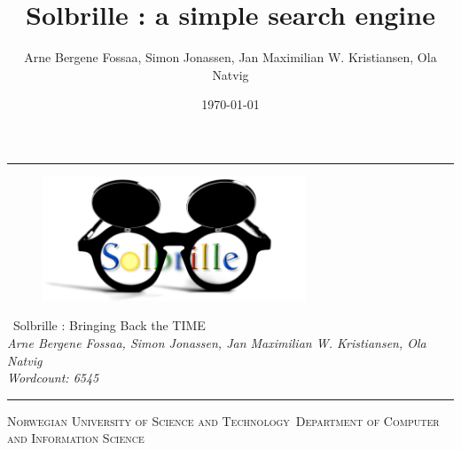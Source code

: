 \title{Solbrille : a simple search engine}
\author{Arne Bergene Fossaa, Simon Jonassen, Jan Maximilian W. Kristiansen, Ola Natvig}
\date{\today}

\newcommand{\HRule}{\rule{\linewidth}{1mm}}

\noindent\HRule
\begin{center}
  \begin{figure}[htbp]
  \begin{center}
  \includegraphics[width=0.7\textwidth]{../web/img/logo.png}
  \end{center}
  \end{figure}
  \huge
  \noindent \ Solbrille : Bringing Back the TIME \\ [7mm] \large
  \noindent \emph{Arne Bergene Fossaa, Simon Jonassen, Jan Maximilian W. Kristiansen, Ola
 Natvig}\\
  \emph{Wordcount: 6545}
\end{center}
\noindent\HRule
{}
\begin{center}
\Large\textsc{Norwegian University of Science and Technology}\
\Large\textsc{Department of Computer and Information Science}\
\end{center}
